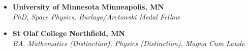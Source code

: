 
\begin{itemize}[leftmargin=\parindent]
        \parskip=0.1em

    \item[]
        \headerrow
        {\textbf{University of Minnesota}}
        {\textbf{Minneapolis, MN}}
        \\
        \headerrow
        {\emph{PhD, Space Physics, Burlaga/Arctowski Medal Fellow}}
        {\emph{}}

    \item[]
        \headerrow
        {\textbf{St Olaf College}}
        {\textbf{Northfield, MN}}
        \\
        \headerrow
        {\emph{BA, Mathematics (Distinction), Physics (Distinction), Magna Cum Laude}}
        {\emph{}}
\end{itemize}
